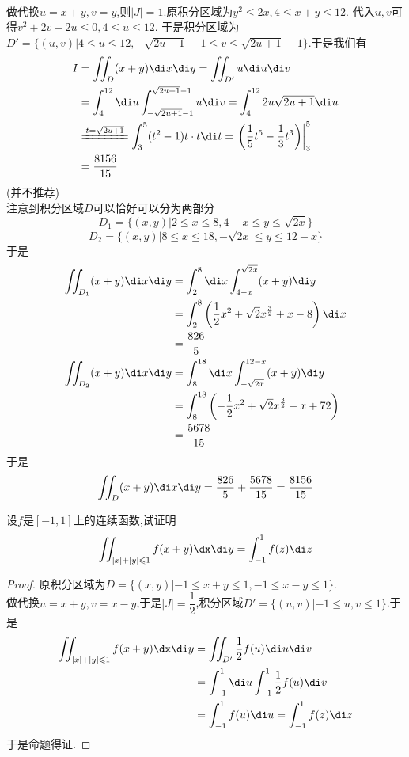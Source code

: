 \documentclass{ctexart}
\begin{document}
\begin{solution}
    \\
    做代换$u=x+y,v=y$,则$|J|=1$.原积分区域为$y^2\leqslant2x,4\leqslant x+y\leqslant12$.%
    代入$u,v$可得$v^2+2v-2u\leqslant0,4\leqslant u\leqslant12$.%
    于是积分区域为$D'=\{(u,v)|4\leqslant u\leqslant12,-\sqrt{2u+1}-1\leqslant v\leqslant\sqrt{2u+1}-1\}$.于是我们有
    \[\begin{aligned}
        I
        &= \iint_D(x+y)\di x\di y = \iint_{D'}u\di u\di v \\
        &= \int_4^{12}\di u\int_{-\sqrt{2u+1}-1}^{\sqrt{2u+1}-1}u\di v = \int_{4}^{12}2u\sqrt{2u+1}\di u \\
        &\xlongequal{t=\sqrt{2u+1}}\int_3^5(t^2-1)t\cdot t\di t = \left.\left(\dfrac{1}{5}t^5-\dfrac13t^3\right)\right|_3^5 \\
        &= \dfrac{8156}{15} 
    \end{aligned}\]
    (并不推荐)\\
    注意到积分区域$D$可以恰好可以分为两部分
    \[D_1=\{(x,y)|2\leqslant x\leqslant8,4-x\leqslant y\leqslant\sqrt{2x}\}\]
    \[D_2=\{(x,y)|8\leqslant x\leqslant18,-\sqrt{2x}\leqslant y\leqslant 12-x\}\]
    于是
    \[\begin{aligned}
        \iint_{D_1}(x+y)\di x\di y
        &= \int_2^8\di x\int_{4-x}^{\sqrt{2x}}(x+y)\di y \\
        &= \int_2^8\left(\dfrac12x^2+\sqrt{2}x^{\frac32}+x-8\right)\di x \\
        &= \dfrac{826}{5}\\
        \iint_{D_2}(x+y)\di x\di y
        &= \int_8^{18}\di x\int_{-\sqrt{2x}}^{12-x}(x+y)\di y \\
        &= \int_8^{18}\left(-\dfrac12x^2+\sqrt2x^{\frac32}-x+72\right) \\
        &= \dfrac{5678}{15}
    \end{aligned}\]
    于是
    \[\iint_D(x+y)\di x\di y=\dfrac{826}{5}+\dfrac{5678}{15}=\dfrac{8156}{15}\]
\end{solution}
\begin{problem}[L.2.4]
    设$f$是$[-1,1]$上的连续函数,试证明
    \[\iint_{|x|+|y|\leqslant1}f(x+y)\dx\di y=\int_{-1}^{1}f(z)\di z\]
\end{problem}
\begin{proof}
    原积分区域为$D=\{(x,y)|-1\leqslant x+y\leqslant 1,-1\leqslant x-y\leqslant 1\}$.\\
    做代换$u=x+y,v=x-y$,于是$|J|=\dfrac12$,积分区域$D'=\{(u,v)|-1\leqslant u,v\leqslant1\}$.于是
    \[\begin{aligned}
        \iint_{|x|+|y|\leqslant1}f(x+y)\dx\di y
        &=\iint_{D'}\dfrac12f(u)\di u\di v \\
        &=\int_{-1}^{1}\di u\int_{-1}^1\dfrac12f(u)\di v \\
        &=\int_{-1}^{1}f(u)\di u=\int_{-1}^{1}f(z)\di z
    \end{aligned}\]
    于是命题得证.
\end{proof}
\end{document}
